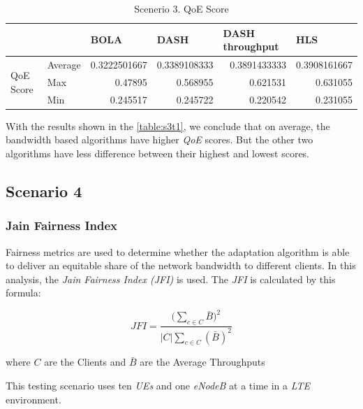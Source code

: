 \begin{table}[h]
    \begin{tabular}{@{}llrrrr@{}}
    \toprule
    &         & \multicolumn{1}{l}{BOLA} & \multicolumn{1}{l}{DASH} & \multicolumn{1}{l}{DASH throughput} & \multicolumn{1}{l}{HLS} \\ \midrule
    \multirow{3}{*}{QoE Score} & Average & 0.3222501667             & 0.3389108333             & 0.3891433333                        & 0.3908161667            \\
                               & Max     & 0.47895                  & 0.568955                 & 0.621531                            & 0.631055                \\
                               & Min     & 0.245517                 & 0.245722                 & 0.220542                            & 0.231055                \\ \bottomrule
    \end{tabular}
    \caption{Scenerio 3. QoE Score}
    \label{table:s3t1}
\end{table}

With the results shown in the \autoref{table:s3t1}, we conclude that on average,
the bandwidth based algorithms have higher \textit{QoE} scores. But the other two
algorithms have less difference between their highest and lowest scores.

\subsection{Scenario 4}

\subsubsection{Jain Fairness Index}

Fairness metrics are used to determine whether the adaptation 
algorithm is able to deliver an equitable share of the network bandwidth 
to different clients. In this analysis, the \textit{Jain Fairness Index (JFI)}
\cite{jfi} is used. The \textit{JFI} is calculated by this formula:

\begin{equation}
    JFI=\frac{\bigg(\sum\limits_{c\in C}\bar{B}\bigg)^2}{\left | C \right |\sum\limits_{c\in C}(\bar{B})^2}
\end{equation}

where  $C$ are the Clients and $\bar{B}$ are the Average Throughputs

This testing scenario uses ten \textit{UEs} and one \textit{eNodeB} at a time in a \textit{LTE} environment.


